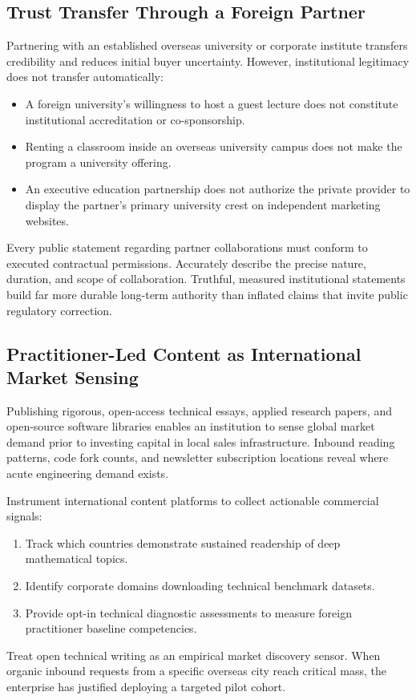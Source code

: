 \subsection{Trust Transfer Through a Foreign Partner}
\label{sec:trust_transfer_foreign_partners}

Partnering with an established overseas university or corporate institute transfers credibility and reduces initial buyer uncertainty. However, institutional legitimacy does not transfer automatically:
\begin{itemize}
\item A foreign university's willingness to host a guest lecture does not constitute institutional accreditation or co-sponsorship.
\item Renting a classroom inside an overseas university campus does not make the program a university offering.
\item An executive education partnership does not authorize the private provider to display the partner's primary university crest on independent marketing websites.
\end{itemize}
Every public statement regarding partner collaborations must conform to executed contractual permissions. Accurately describe the precise nature, duration, and scope of collaboration. Truthful, measured institutional statements build far more durable long-term authority than inflated claims that invite public regulatory correction.

\subsection{Practitioner-Led Content as International Market Sensing}
\label{sec:practitioner_content_market_sensing}

Publishing rigorous, open-access technical essays, applied research papers, and open-source software libraries enables an institution to sense global market demand prior to investing capital in local sales infrastructure. Inbound reading patterns, code fork counts, and newsletter subscription locations reveal where acute engineering demand exists.

Instrument international content platforms to collect actionable commercial signals:
\begin{enumerate}
\item Track which countries demonstrate sustained readership of deep mathematical topics.
\item Identify corporate domains downloading technical benchmark datasets.
\item Provide opt-in technical diagnostic assessments to measure foreign practitioner baseline competencies.
\end{enumerate}
Treat open technical writing as an empirical market discovery sensor. When organic inbound requests from a specific overseas city reach critical mass, the enterprise has justified deploying a targeted pilot cohort.

